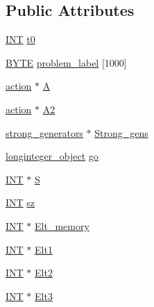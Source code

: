 \subsection*{Public Attributes}
\begin{DoxyCompactItemize}
\item 
\mbox{\hyperlink{galois_8h_a09fddde158a3a20bd2dcadb609de11dc}{I\+NT}} \mbox{\hyperlink{classgenerator_acb42b7497f082879f3c87a240e622191}{t0}}
\item 
\mbox{\hyperlink{galois_8h_ab6cc7b4aeb6ea31aba2b3fbfc83ff5e6}{B\+Y\+TE}} \mbox{\hyperlink{classgenerator_ab7ab2e9010d56446e2fc0c6cff624a55}{problem\+\_\+label}} \mbox{[}1000\mbox{]}
\item 
\mbox{\hyperlink{classaction}{action}} $\ast$ \mbox{\hyperlink{classgenerator_a6d63c44007eb96239d50c9bc0f21622c}{A}}
\item 
\mbox{\hyperlink{classaction}{action}} $\ast$ \mbox{\hyperlink{classgenerator_a481f47df2fa87dbb8123e16a230e6f66}{A2}}
\item 
\mbox{\hyperlink{classstrong__generators}{strong\+\_\+generators}} $\ast$ \mbox{\hyperlink{classgenerator_a77dc04e103263b3732b3122dc796b77e}{Strong\+\_\+gens}}
\item 
\mbox{\hyperlink{classlonginteger__object}{longinteger\+\_\+object}} \mbox{\hyperlink{classgenerator_a52320c8f288e892987d7af3b89dad4a0}{go}}
\item 
\mbox{\hyperlink{galois_8h_a09fddde158a3a20bd2dcadb609de11dc}{I\+NT}} $\ast$ \mbox{\hyperlink{classgenerator_a5d2b65e2bd0e451744af1a47ba00bd96}{S}}
\item 
\mbox{\hyperlink{galois_8h_a09fddde158a3a20bd2dcadb609de11dc}{I\+NT}} \mbox{\hyperlink{classgenerator_ad7f9a92bb686f90239fd2ec3d4cbf42e}{sz}}
\item 
\mbox{\hyperlink{galois_8h_a09fddde158a3a20bd2dcadb609de11dc}{I\+NT}} $\ast$ \mbox{\hyperlink{classgenerator_aa3ff1eb4650dc4b21f1da8e71de62484}{Elt\+\_\+memory}}
\item 
\mbox{\hyperlink{galois_8h_a09fddde158a3a20bd2dcadb609de11dc}{I\+NT}} $\ast$ \mbox{\hyperlink{classgenerator_a21f9ff1095b1189e0c8b7114e0fc8e17}{Elt1}}
\item 
\mbox{\hyperlink{galois_8h_a09fddde158a3a20bd2dcadb609de11dc}{I\+NT}} $\ast$ \mbox{\hyperlink{classgenerator_a55f2a13fef79322ae27a5bce1403381f}{Elt2}}
\item 
\mbox{\hyperlink{galois_8h_a09fddde158a3a20bd2dcadb609de11dc}{I\+NT}} $\ast$ \mbox{\hyperlink{classgenerator_a07fb82b50fe097094be2d8cbac1548f4}{Elt3}}
\item 

\end{DoxyCompactItemize}

